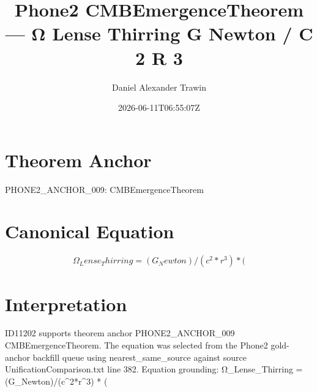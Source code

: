 \documentclass[11pt]{article}
\title{Phone2 CMBEmergenceTheorem — Ω Lense Thirring G Newton / C 2 R 3}
\author{Daniel Alexander Trawin}
\date{2026-06-11T06:55:07Z}
\begin{document}
\maketitle
\section*{Theorem Anchor}
PHONE2_ANCHOR_009: CMBEmergenceTheorem
\section*{Canonical Equation}
\[
Ω_Lense_Thirring = (G_Newton)/(c^2*r^3) * (
\]
\section*{Interpretation}
ID11202 supports theorem anchor PHONE2_ANCHOR_009 CMBEmergenceTheorem. The equation was selected from the Phone2 gold-anchor backfill queue using nearest_same_source against source UnificationComparison.txt line 382. Equation grounding: Ω_Lense_Thirring = (G_Newton)/(c^2*r^3) * (
\end{document}
